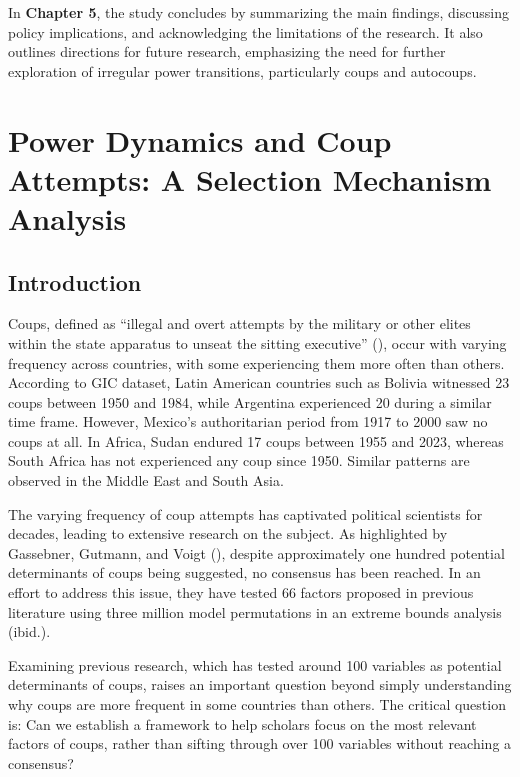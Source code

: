 \documentclass[
  12pt,
]{report}
\begin{document}
In \textbf{Chapter 5}, the study concludes by summarizing the main
findings, discussing policy implications, and acknowledging the
limitations of the research. It also outlines directions for future
research, emphasizing the need for further exploration of irregular
power transitions, particularly coups and autocoups.

\chapter{Power Dynamics and Coup Attempts: A Selection Mechanism
Analysis}\label{power-dynamics-and-coup-attempts-a-selection-mechanism-analysis}

\section{Introduction}\label{introduction-1}

Coups, defined as ``illegal and overt attempts by the military or other
elites within the state apparatus to unseat the sitting executive''
(), occur
with varying frequency across countries, with some experiencing them
more often than others. According to GIC dataset, Latin American
countries such as Bolivia witnessed 23 coups between 1950 and 1984,
while Argentina experienced 20 during a similar time frame. However,
Mexico's authoritarian period from 1917 to 2000 saw no coups at all. In
Africa, Sudan endured 17 coups between 1955 and 2023, whereas South
Africa has not experienced any coup since 1950. Similar patterns are
observed in the Middle East and South Asia.

The varying frequency of coup attempts has captivated political
scientists for decades, leading to extensive research on the subject. As
highlighted by Gassebner, Gutmann, and Voigt
(), despite approximately one hundred
potential determinants of coups being suggested, no consensus has been
reached. In an effort to address this issue, they have tested 66 factors
proposed in previous literature using three million model permutations
in an extreme bounds analysis (ibid.).

Examining previous research, which has tested around 100 variables as
potential determinants of coups, raises an important question beyond
simply understanding why coups are more frequent in some countries than
others. The critical question is: Can we establish a framework to help
scholars focus on the most relevant factors of coups, rather than
sifting through over 100 variables without reaching a consensus?
\end{document}
